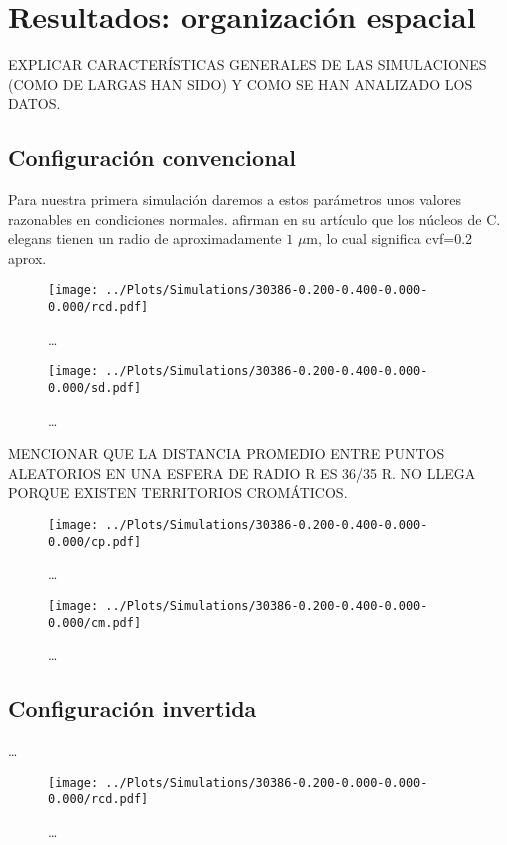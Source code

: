 \chapter{Resultados: organización espacial}
\label{cap:results}

EXPLICAR CARACTERÍSTICAS GENERALES DE LAS SIMULACIONES (COMO DE LARGAS HAN SIDO) Y COMO SE HAN ANALIZADO LOS DATOS.

\section{Configuración convencional}

Para nuestra primera simulación daremos a estos parámetros unos valores razonables en condiciones normales. \cite{Ikegami2010} afirman en su artículo que los núcleos de C. elegans tienen un radio de aproximadamente $1$ $\mu$m, lo cual significa cvf=0.2 aprox.

\begin{figure}
    \centering
    \texttt{[image: ../Plots/Simulations/30386-0.200-0.400-0.000-0.000/rcd.pdf]}
    \caption{\dots}
    \label{fig:rcd_c}
\end{figure}

\begin{figure}
    \centering
    \texttt{[image: ../Plots/Simulations/30386-0.200-0.400-0.000-0.000/sd.pdf]}
    \caption{\dots}
    \label{fig:sd_c}
\end{figure}

MENCIONAR QUE LA DISTANCIA PROMEDIO ENTRE PUNTOS ALEATORIOS EN UNA ESFERA DE RADIO R ES 36/35 R. NO LLEGA PORQUE EXISTEN TERRITORIOS CROMÁTICOS.

\begin{figure}
    \centering
    \texttt{[image: ../Plots/Simulations/30386-0.200-0.400-0.000-0.000/cp.pdf]}
    \caption{\dots}
    \label{fig:cp_c}
\end{figure}

\begin{figure}
    \centering
    \texttt{[image: ../Plots/Simulations/30386-0.200-0.400-0.000-0.000/cm.pdf]}
    \caption{\dots}
    \label{fig:cm_c}
\end{figure}

\section{Configuración invertida}

\dots

\begin{figure}
    \centering
    \texttt{[image: ../Plots/Simulations/30386-0.200-0.000-0.000-0.000/rcd.pdf]}
    \caption{\dots}
    \label{fig:rcd_i}
\end{figure}

